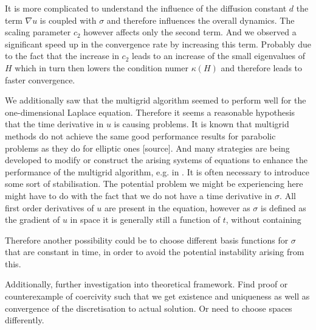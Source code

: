 \documentclass[../draft_1.tex]{subfiles}
\begin{document}
It is more complicated to understand the influence of the diffusion constant $d$ the term $\nabla u$ is coupled with $\sigma$ and therefore influences the overall dynamics. The scaling parameter $c_2$ however affects only the second term. And we observed a significant speed up in the convergence rate by increasing this term. Probably due to the fact that the increase in $c_2$ leads to an increase of the small eigenvalues of $H$ which in turn then lowers the condition numer $\kappa(H)$ and therefore leads to faster convergence. 


We additionally saw that the multigrid algorithm seemed to perform well for the one-dimensional Laplace equation. Therefore it seems a reasonable hypothesis that the time derivative in $u$ is causing problems. It is known that multigrid methods do not achieve the same good performance results for parabolic problems as they do for elliptic ones [source]. And many strategies are being developed to modify or construct the arising systems of equations to enhance the performance of the multigrid algorithm, e.g. in \cite{langer2017multipatch}. It is often necessary to introduce some sort of stabilisation. The potential problem we might be experiencing here might have to do with the fact that we do not have a time derivative in $\sigma$. All first order derivatives of $u$ are present in the equation, however as $\sigma$ is defined as the gradient of $u$ in space it is generally still a function of $t$, without containing 

Therefore another possibility could be to choose different basis functions for $\sigma$ that are constant in time, in order to avoid the potential instability arising from this. 


Additionally, further investigation into theoretical framework. Find proof or counterexample of coercivity such that we get existence and uniqueness as well as convergence of the discretisation to actual solution. Or need to choose spaces differently. 
\end{document}
